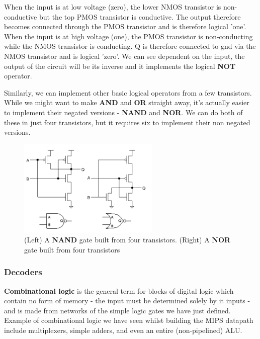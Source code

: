 \documentclass{article}
\begin{document}
	When the input is at low voltage (zero), the lower NMOS transistor is non-conductive but the top PMOS transistor is conductive. The output therefore becomes connected through the PMOS transistor and is therefore logical 'one'. When the input is at high voltage (one), the PMOS transistor is non-conducting while the NMOS transistor is conducting. Q is therefore connected to gnd via the NMOS transistor and is logical 'zero'. We can see dependent on the input, the output of the circuit will be its inverse and it implements the logical \textbf{NOT} operator.
	
	Similarly, we can implement other basic logical operators from a few transistors. While we might want to make \textbf{AND} and \textbf{OR} straight away, it's actually easier to implement their negated versions - \textbf{NAND} and \textbf{NOR}. We can do both of these in just four transistors, but it requires six to implement their non negated versions.
	
	\begin{figure}[ht]
		\centering
		\includegraphics[width=0.6\textwidth]{nand_nor_transistors}
		\caption{(Left) A \textbf{NAND} gate built from four transistors.  (Right) A \textbf{NOR} gate built from four transistors}
		\label{fig:nand_nor_transistors}
	\end{figure}
	
	\subsubsection{Decoders}
	\par 
	\textbf{Combinational logic} is the general term for blocks of digital logic which contain no form of memory - the input must be determined solely by it inputs - and is made from networks of the simple logic gates we have just defined. Example of combinational logic we have seen whilst building the MIPS datapath include multiplexers, simple adders, and even an entire (non-pipelined) ALU.
	
\end{document}
